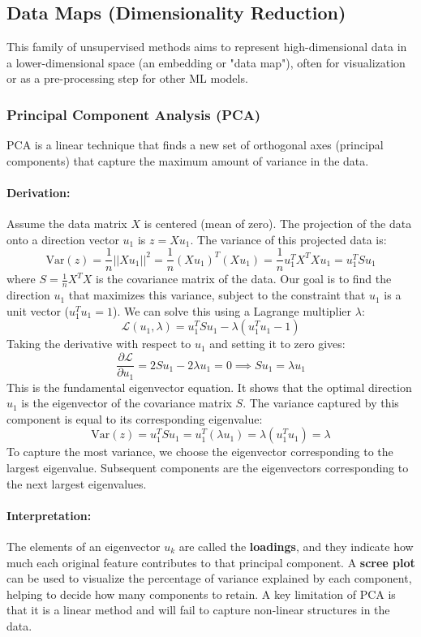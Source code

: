 \documentclass{article}
\begin{document}
\begin{multicols}{2}
	\subsection{Data Maps (Dimensionality Reduction)}
	This family of unsupervised methods aims to represent high-dimensional data in a lower-dimensional space (an embedding or "data map"), often for visualization or as a pre-processing step for other ML models.

	\subsubsection{Principal Component Analysis (PCA)}
	PCA is a linear technique that finds a new set of orthogonal axes (principal components) that capture the maximum amount of variance in the data.

	\paragraph{Derivation:}
	Assume the data matrix $X$ is centered (mean of zero). The projection of the data onto a direction vector $u_1$ is $z = Xu_1$. The variance of this projected data is:
	$$ \text{Var}(z) = \frac{1}{n}||Xu_1||^2 = \frac{1}{n} (Xu_1)^T (Xu_1) = \frac{1}{n} u_1^T X^T X u_1 = u_1^T S u_1 $$
	where $S = \frac{1}{n}X^T X$ is the covariance matrix of the data. Our goal is to find the direction $u_1$ that maximizes this variance, subject to the constraint that $u_1$ is a unit vector ($u_1^T u_1 = 1$). We can solve this using a Lagrange multiplier $\lambda$:
	$$ \mathcal{L}(u_1, \lambda) = u_1^T S u_1 - \lambda(u_1^T u_1 - 1) $$
	Taking the derivative with respect to $u_1$ and setting it to zero gives:
	$$ \frac{\partial \mathcal{L}}{\partial u_1} = 2Su_1 - 2\lambda u_1 = 0 \implies Su_1 = \lambda u_1 $$
	This is the fundamental eigenvector equation. It shows that the optimal direction $u_1$ is the eigenvector of the covariance matrix $S$. The variance captured by this component is equal to its corresponding eigenvalue:
	$$ \text{Var}(z) = u_1^T S u_1 = u_1^T (\lambda u_1) = \lambda (u_1^T u_1) = \lambda $$
	To capture the most variance, we choose the eigenvector corresponding to the largest eigenvalue. Subsequent components are the eigenvectors corresponding to the next largest eigenvalues.

	\paragraph{Interpretation:} The elements of an eigenvector $u_k$ are called the \textbf{loadings}, and they indicate how much each original feature contributes to that principal component. A \textbf{scree plot} can be used to visualize the percentage of variance explained by each component, helping to decide how many components to retain. A key limitation of PCA is that it is a linear method and will fail to capture non-linear structures in the data.


\end{multicols}
\end{document}
